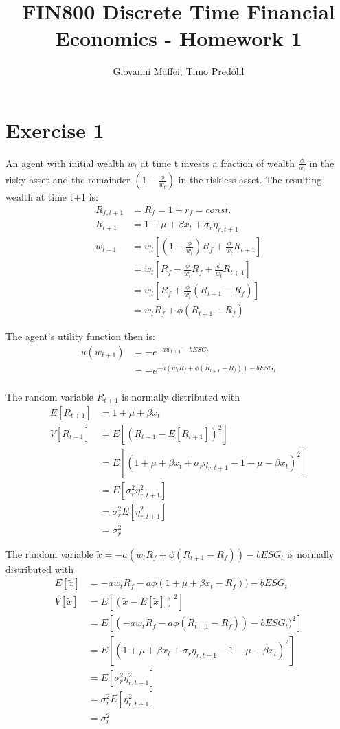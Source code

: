 \documentclass[]{article}
\title{FIN800 Discrete Time Financial Economics - Homework 1}
\author{Giovanni Maffei, Timo Predöhl}
\begin{document}
\maketitle

\section{Exercise 1}
An agent with initial wealth $w_t$ at time t invests a fraction of wealth $\frac{\phi}{w_t}$ in the risky asset and the remainder $(1-\frac{\phi}{w_t})$ in the riskless asset. The resulting wealth at time t+1 is:
\begin{align*}
	R_{f,t+1} &= R_{f} = 1+r_f = const.\\
	R_{t+1} &= 1 + \mu + \beta x_t + \sigma_r \eta_{r, t+1}\\
	w_{t+1} &= w_t[(1-\frac{\phi}{w_t})R_f+\frac{\phi}{w_t} R_{t+1}]\\
	&= w_t[R_f - \frac{\phi}{w_t} R_f + \frac{\phi}{w_t} R_{t+1}]\\
	&= w_t[R_f + \frac{\phi}{w_t} (R_{t+1} - R_f)]\\
	&= w_t R_f + \phi (R_{t+1} - R_f)
\end{align*}

The agent's utility function then is:
\begin{align*}
	u(w_{t+1}) &= -e^{-aw_{t+1} - bESG_t}\\
	&= -e^{-a(w_t R_f + \phi (R_{t+1} - R_f)) - bESG_t}\\
\end{align*}

The random variable $R_{t+1}$ is normally distributed with 
\begin{align*}
	E[R_{t+1}] &= 1+\mu+\beta x_t\\
	V[R_{t+1}] &= E[(R_{t+1} - E[R_{t+1}])^2]\\
	&= E[(1 + \mu + \beta x_t + \sigma_r \eta_{r, t+1} - 1 - \mu - \beta x_t)^2]\\
	&= E[\sigma_r^2 \eta_{r, t+1}^2]\\
	&= \sigma_r^2 E[\eta_{r, t+1}^2]\\
	&= \sigma_r^2
\end{align*}

The random variable $\tilde{x} = -a(w_t R_f + \phi (R_{t+1} - R_f)) - bESG_t$ is normally distributed with 
\begin{align*}
	E[\tilde{x}] &= -aw_t R_f -a \phi (1+\mu+\beta x_t - R_f)) - bESG_t\\
	V[\tilde{x}] &= E[(\tilde{x} - E[\tilde{x}])^2]\\
	&= E[(-aw_t R_f - a \phi (R_{t+1} - R_f)) - bESG_t)^2]\\
	&= E[(1 + \mu + \beta x_t + \sigma_r \eta_{r, t+1} - 1 - \mu - \beta x_t)^2]\\
	&= E[\sigma_r^2 \eta_{r, t+1}^2]\\
	&= \sigma_r^2 E[\eta_{r, t+1}^2]\\
	&= \sigma_r^2
\end{align*}
\end{document}
